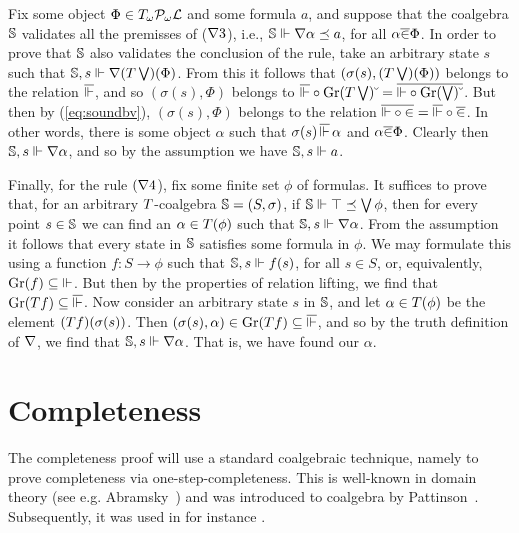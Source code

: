 \documentclass{book}
\begin{document}
Fix some object $\Phi \in T_{\omega}\mathcal{P}_{\omega}\mathcal{L}$ and some formula
$a$, and suppose that the coalgebra $\mathbb{S}$ validates all the
premisses of ($\nabla3$), i.e., $\mathbb{S} \Vdash \nabla\alpha
\preceq a$, for all $\alpha \overline{\in} \Phi$.  In order to prove
that $\mathbb{S}$ also validates the conclusion of the rule, take an
arbitrary state $s$ such that $\mathbb{S},s \Vdash \nabla
(T\bigvee)(\Phi)$.  From this it follows that
$(\sigma(s),(T\bigvee)(\Phi))$ belongs to the relation
$\overline{\Vdash}$, and so $(\sigma(s),\Phi)$ belongs to
$\overline{\Vdash} \circ \mathrm{Gr}(T\bigvee)\breve{\hspace*{1mm}} =
\overline{{\Vdash}\circ \mathrm{Gr}(\bigvee)\breve{\hspace*{1mm}}}$.  But then by
(\ref{eq:soundbv}), $(\sigma(s),\Phi)$ belongs to the relation
$\overline{{\Vdash} \circ {\in}} = \overline{\Vdash} \circ \overline{\in}$.
In other words, there is some object $\alpha$ such that $\sigma(s)
\,\overline{\Vdash}\,\alpha$ and $\alpha \overline{\in} \Phi$.  Clearly
then $\mathbb{S},s \Vdash \nabla\alpha$, and so by the assumption we
have $\mathbb{S},s \Vdash a$.

Finally, for the rule $(\nabla4$), fix some finite set $\phi$ of
formulas.  It suffices to prove that, for an arbitrary
$T$-coalgebra $\mathbb{S} = (S,\sigma)$, if $\mathbb{S} \Vdash \top
\preceq \bigvee\phi$, then for every point $s \in \mathbb{S}$ we can
find an $\alpha \in T(\phi)$ such that $\mathbb{S},s \Vdash
\nabla\alpha$.
From the assumption it follows that every state in $\mathbb{S}$
satisfies some formula in $\phi$.  We may formulate this using a
function $f: S \to \phi$ such that $\mathbb{S}, s\Vdash f(s)$, for all
$s \in S$, or, equivalently, $\mathrm{Gr}(f) \subseteq {\Vdash}$.  But
then by the properties of relation lifting, we find that
$\mathrm{Gr}(T f) \subseteq \overline{\Vdash}$.  Now consider an
arbitrary state $s$ in $\mathbb{S}$, and let $\alpha \in T(\phi)$
be the element $(T f)(\sigma(s))$.  Then $(\sigma(s),\alpha) \in
\mathrm{Gr}(T f) \subseteq \overline{\Vdash}$, and so by the truth
definition of $\nabla$, we find that $\mathbb{S},s \Vdash
\nabla\alpha$.  That is, we have found our $\alpha$.



%
\section{Completeness}
\newcommand{\xxviLift}{\mathfrak{L}}

The completeness proof will use a standard coalgebraic technique,
namely to prove completeness via one-step-completeness. This is
well-known in domain theory (see e.g.  Abramsky~\cite{abramsky:dtlf})
and was introduced to coalgebra by Pattinson~\cite{pattinson:cml-j}.
Subsequently, it was used in for instance
\cite{cirs-patt:concur04-j,kkp:cmcs04,kurz-petr:cmcs08}.
\end{document}
